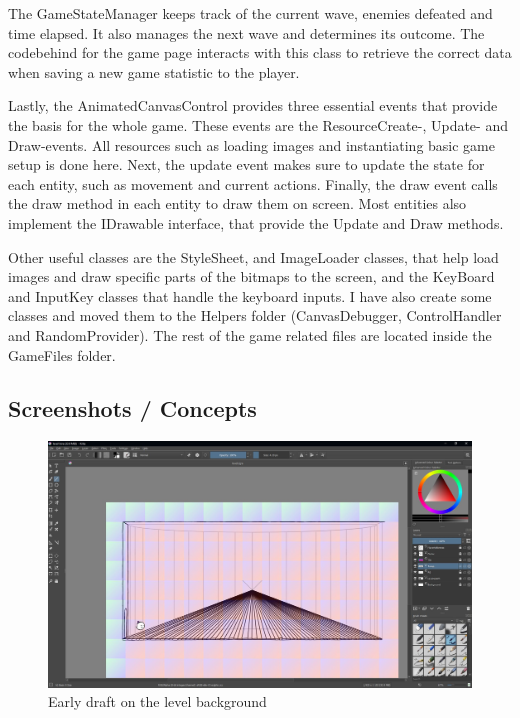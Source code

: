 \documentclass[12pt]{article}
\begin{document}
        The GameStateManager keeps track of the current wave, enemies defeated and time elapsed. It also manages the next wave and determines its outcome. The codebehind for the game page interacts with this class to retrieve the correct data when saving a new game statistic to the player.

        Lastly, the AnimatedCanvasControl provides three essential events that provide the basis for the whole game. These events are the ResourceCreate-, Update- and Draw-events. All resources such as loading images and instantiating basic game setup is done here. Next, the update event makes sure to update the state for each entity, such as movement and current actions. Finally, the draw event calls the draw method in each entity to draw them on screen. Most entities also implement the IDrawable interface, that provide the Update and Draw methods.

        Other useful classes are the StyleSheet, and ImageLoader classes, that help load images and draw specific parts of the bitmaps to the screen, and the KeyBoard and InputKey classes that handle the keyboard inputs. I have also create some classes and moved them to the Helpers folder (CanvasDebugger, ControlHandler and RandomProvider). The rest of the game related files are located inside the GameFiles folder.

\subsection{Screenshots / Concepts}

\begin{figure}[H]
    \centering
    \includegraphics[max width=\textwidth]{images/002.JPG}
    \caption{Early draft on the level background}
\end{figure}
\end{document}

